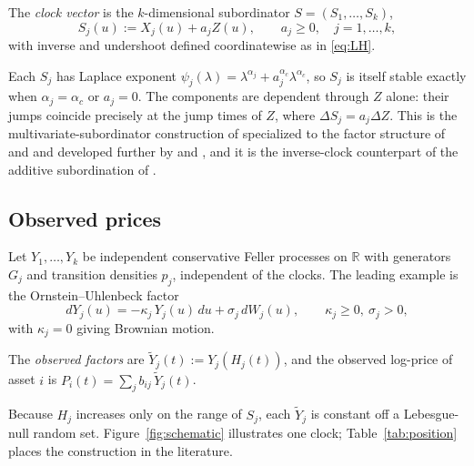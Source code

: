 \documentclass{ws-ijtaf}
\newcommand{\R}{\mathbb{R}}
\begin{document}
\begin{definition}\label{def:clock}
The \emph{clock vector} is the $k$-dimensional subordinator $S=(S_1,\dots,S_k)$,
\begin{equation}
S_j(u) := X_j(u) + a_j Z(u), \qquad a_j \ge 0, \quad j=1,\dots,k ,
\label{eq:clock}
\end{equation}
with inverse and undershoot defined coordinatewise as in \eqref{eq:LH}.
\end{definition}

Each $S_j$ has Laplace exponent
$\psi_j(\lambda) = \lambda^{\alpha_j} + a_j^{\alpha_c}\lambda^{\alpha_c}$, so
$S_j$ is itself stable exactly when $\alpha_j=\alpha_c$ or $a_j=0$. The
components are dependent through $Z$ alone: their jumps coincide precisely at
the jump times of $Z$, where $\Delta S_j = a_j\Delta Z$. This is the
multivariate-subordinator construction of \citet{bar01} specialized to the
factor structure of \citet{sem08} and \citet{luc10} and developed further by
\citet{sem22} and \citet{ami25a}, and it is the inverse-clock counterpart of the
additive subordination of \citet{don25}.

\subsection{Observed prices}

Let $Y_1,\dots,Y_k$ be independent conservative Feller processes on $\R$ with
generators $G_j$ and transition densities $p_j$, independent of the clocks. The
leading example is the Ornstein--Uhlenbeck factor
\begin{equation}
dY_j(u) = -\kappa_j\, Y_j(u)\, du + \sigma_j\, dW_j(u),
\qquad \kappa_j\ge 0,\ \sigma_j>0 ,
\label{eq:ou}
\end{equation}
with $\kappa_j=0$ giving Brownian motion.

\begin{definition}\label{def:model}
The \emph{observed factors} are $\tilde Y_j(t) := Y_j(H_j(t))$, and the observed
log-price of asset $i$ is $P_i(t) = \sum_{j} b_{ij}\, \tilde Y_j(t)$.
\end{definition}

Because $H_j$ increases only on the range of $S_j$, each $\tilde Y_j$ is
constant off a Lebesgue-null random set. Figure~\ref{fig:schematic} illustrates
one clock; Table~\ref{tab:position} places the construction in the literature.
\end{document}
